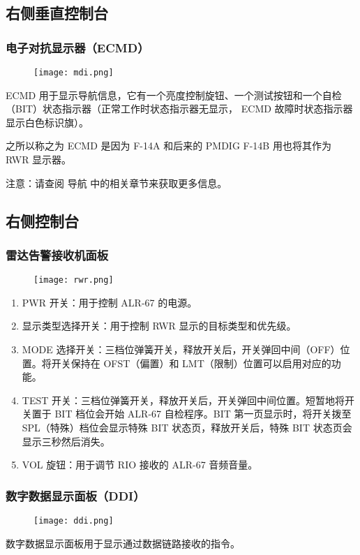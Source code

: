 \subsection{右侧垂直控制台}

\subsubsection{电子对抗显示器（ECMD）}
\begin{figure}[htb]
	\centering
	\texttt{[image: mdi.png]}
\end{figure}
ECMD 用于显示导航信息，它有一个亮度控制旋钮、一个测试按钮和一个自检（BIT）状态指示器（正常工作时状态指示器无显示， ECMD 故障时状态指示器显示白色标识旗）。

之所以称之为 ECMD 是因为 F-14A 和后来的 PMDIG F-14B 用也将其作为 RWR 显示器。

注意：请查阅 导航 中的相关章节来获取更多信息。

\subsection{右侧控制台}

\subsubsection{雷达告警接收机面板}
\begin{figure}[htb]
	\centering
	\texttt{[image: rwr.png]}
\end{figure}

\begin{enumerate}
	\item PWR 开关：用于控制 ALR-67 的电源。
	\item 显示类型选择开关：用于控制 RWR 显示的目标类型和优先级。
	\item MODE 选择开关：三档位弹簧开关，释放开关后，开关弹回中间（OFF）位置。将开关保持在 OFST（偏置）和 LMT（限制）位置可以启用对应的功能。
	\item TEST 开关：三档位弹簧开关，释放开关后，开关弹回中间位置。短暂地将开关置于 BIT 档位会开始 ALR-67 自检程序。BIT 第一页显示时，将开关拨至 SPL（特殊）档位会显示特殊 BIT 状态页，释放开关后，特殊 BIT 状态页会显示三秒然后消失。
	\item VOL 旋钮：用于调节 RIO 接收的 ALR-67 音频音量。
\end{enumerate}

\subsubsection{数字数据显示面板（DDI）}
\begin{figure}[htb]
	\centering
	\texttt{[image: ddi.png]}
\end{figure}
数字数据显示面板用于显示通过数据链路接收的指令。

